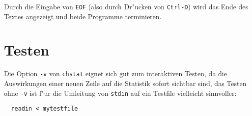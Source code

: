 Durch die Eingabe von {\tt EOF} (also durch Dr"ucken von {\tt Ctrl-D})
wird das Ende des Textes angezeigt und beide Programme terminieren.



\section*{Testen}

Die Option {\tt -v} von {\tt chstat} eignet sich gut zum interaktiven
Testen, da die Auswirkungen einer neuen Zeile auf die Statistik sofort
sichtbar sind, das Testen ohne {\tt -v} ist f"ur die Umleitung von
{\tt stdin} auf ein Testfile vielleicht sinnvoller:
\begin{verbatim}
  readin < mytestfile
\end{verbatim}

\osueguidelinesthree


